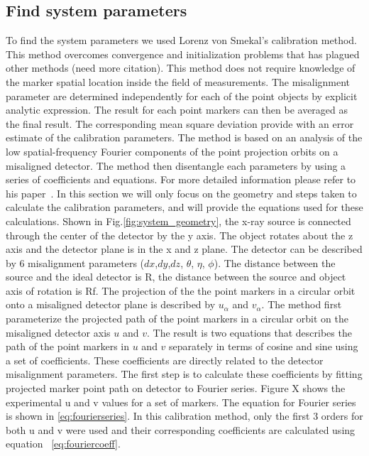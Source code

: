 \subsection{Find system parameters}
To find the system parameters we used Lorenz von Smekal's calibration method. This method overcomes convergence and initialization problems that has plagued other methods (need more citation).  This method does not require knowledge of the marker spatial location inside the field of measurements.  The misalignment parameter are determined independently for each of the point objects by explicit analytic expression.  The result for each point markers can then be averaged as the final result.  The corresponding mean square deviation provide with an error estimate of the calibration parameters.  The method is based on an analysis of the low spatial-frequency Fourier components of the point projection orbits on a misaligned detector.  The method then disentangle each parameters by using a series of coefficients and equations.  For more detailed information please refer to his paper~\citep{Smekal2004}.  In this section we will only focus on the geometry and steps taken to calculate the calibration parameters, and will provide the equations used for these calculations.  Shown in Fig.\ref{fig:system_geometry}, the x-ray source is connected through the center of the detector by the y axis.  The object rotates about the z axis and the detector plane is in the x and z plane.  The detector can be described by 6 misalignment parameters ($dx$,$dy$,$dz$, $\theta$, $\eta$, $\phi$).  The distance between the source and the ideal detector is R, the distance between the source and object axis of rotation is Rf.  The projection of the the point markers in a circular orbit onto a misaligned detector plane is described by $u_{\alpha}$ and $v_{\alpha}$.  The method first parameterize the projected path of the point markers in a circular orbit on the misaligned detector axis $u$ and $v$.  The result is two equations that describes the path of the point markers in $u$ and $v$ separately in terms of cosine and sine using a set of coefficients.  These coefficients are directly related to the detector misalignment parameters.  The first step is to calculate these coefficients by fitting projected marker point path on detector to Fourier series.  Figure X shows the experimental u and v values for a set of markers.  The equation for Fourier series is shown in \ref{eq:fourierseries}.  In this calibration method, only the first 3 orders for both u and v were used and their corresponding coefficients are calculated using equation ~\ref{eq:fouriercoeff}. 

